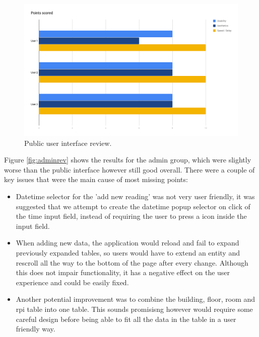 \documentclass{l4proj}
\begin{document}
\begin{figure}
\includegraphics[width=\textwidth]{userrev}
\caption{Public user interface review.}
\label{fig:userrev}
\end{figure}

Figure \ref{fig:adminrev} shows the results for the admin group, which were slightly worse than the public interface however still good overall. There were a couple of key issues that were the main cause of most missing points:
\begin{itemize}	
  \item Datetime selector for the 'add new reading' was not very user friendly, it was suggested that we attempt to create the datetime popup selector on click of the time input field, instead of requiring the user to press a icon inside the input field.
  \item When adding new data, the application would reload and fail to expand previously expanded tables, so users would have to extend an entity and rescroll all the way to the bottom of the page after every change. Although this does not impair functionality, it has a negative effect on the user experience and could be easily fixed.
  \item Another potential improvement was to combine the building, floor, room and rpi table into one table. This sounds promisisng however would require some careful design before being able to fit all the data in the table in a user friendly way.


\end{itemize}
	
\end{document}
